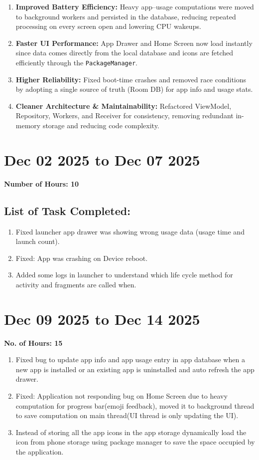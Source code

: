 \documentclass[12pt]{article}
\begin{document}
\begin{enumerate}
\begin{enumerate}
        \item \textbf{Improved Battery Efficiency:} Heavy app–usage computations were moved to background workers and persisted in the database, reducing repeated processing on every screen open and lowering CPU wakeups.
        \item \textbf{Faster UI Performance:} App Drawer and Home Screen now load instantly since data comes directly from the local database and icons are fetched efficiently through the \texttt{PackageManager}.
        \item \textbf{Higher Reliability:} Fixed boot-time crashes and removed race conditions by adopting a single source of truth (Room DB) for app info and usage stats.
        \item \textbf{Cleaner Architecture \& Maintainability:} Refactored ViewModel, Repository, Workers, and Receiver for consistency, removing redundant in-memory storage and reducing code complexity.
    \end{enumerate}
    \section{Dec 02 2025 to Dec 07 2025}
    {\bf Number of Hours: 10}
    \subsection{List of Task Completed:}
    \begin{enumerate}
        \item Fixed launcher app drawer was showing wrong usage data (usage time and launch count).
        \item Fixed: App was crashing on Device reboot.
        \item Added some logs in launcher to understand which life cycle method for activity and fragments are called when.
    \end{enumerate}
    
    \section{ Dec 09 2025 to Dec 14 2025}
    {\bf No. of Hours: 15}
    \begin{enumerate}
        \item Fixed bug to update app info and app usage entry in app database when a new app is installed or an existing app is uninstalled and auto refresh the app drawer.
        \item Fixed: Application not responding bug on Home Screen due to heavy computation for progress bar(emoji feedback), moved it to background thread to save computation on main thread(UI thread is only updating the UI).
        \item Instead of storing all the app icons in the app storage dynamically load the icon from phone storage using package manager to save the space occupied by the application.
    \end{enumerate}

\end{enumerate}
\end{document}
